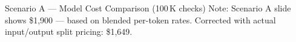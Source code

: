 \documentclass[11pt, aspectratio=169]{beamer}
\begin{document}
\begin{frame}{Scenario A — Model Cost Comparison (100\,K checks)}
  \smallskip
  {\small\textcolor{slate}{Note: Scenario A slide shows \$1,900 — based on blended per-token rates.
  Corrected with actual input/output split pricing: \$1,649.}}

%
%
%
%
%
%
%
%
%

\end{frame}
\end{document}
